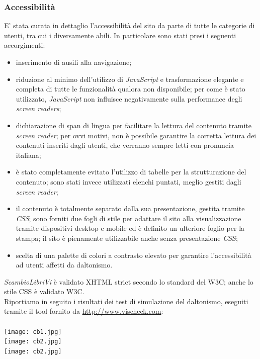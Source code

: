 \documentclass[openany,10pt,a4paper]{article}
\begin{document}
		\subsubsection{Accessibilità}
		E' stata curata in dettaglio l'accessibilità del sito da parte di tutte le categorie di utenti, tra cui i diversamente abili. In particolare sono stati presi i seguenti accorgimenti:
			\begin{itemize}
				\item inserimento di ausili alla navigazione;
				\item riduzione al minimo dell'utilizzo di \textit{JavaScript} e trasformazione elegante e completa di tutte le funzionalità qualora non disponibile; per come è stato utilizzato, \textit{JavaScript} non influisce negativamente sulla performance degli \textit{screen readers};
				\item dichiarazione di span di lingua per facilitare la lettura del contenuto tramite \textit{screen reader}; per ovvi motivi, non è possibile garantire la corretta lettura dei contenuti inseriti dagli utenti, che verranno sempre letti con pronuncia italiana;
				\item è stato completamente evitato l'utilizzo di tabelle per la strutturazione del contenuto; sono stati invece utilizzati elenchi puntati, meglio gestiti dagli \textit{screen reader};
				\item il contenuto è totalmente separato dalla sua presentazione, gestita tramite \textit{CSS}; sono forniti due fogli di stile per adattare il sito alla visualizzazione tramite dispositivi desktop e mobile ed è definito un ulteriore foglio per la stampa; il sito è pienamente utilizzabile anche senza presentazione \textit{CSS};
				\item scelta di una palette di colori a contrasto elevato per garantire l'accessibilità ad utenti affetti da daltonismo.
			\end{itemize}
		\textit{ScambioLibriVi} è validato XHTML strict secondo lo standard del W3C; anche lo stile CSS è validato W3C.
		\\
		Riportiamo in seguito i risultati dei test di simulazione del daltonismo, eseguiti tramite il tool fornito da \url{http://www.vischeck.com}: \\
		\\
		\texttt{[image: cb1.jpg]}\\[3em]
		\texttt{[image: cb2.jpg]}\\[3em]
		\texttt{[image: cb2.jpg]}\\[3em]
			
\end{document}
